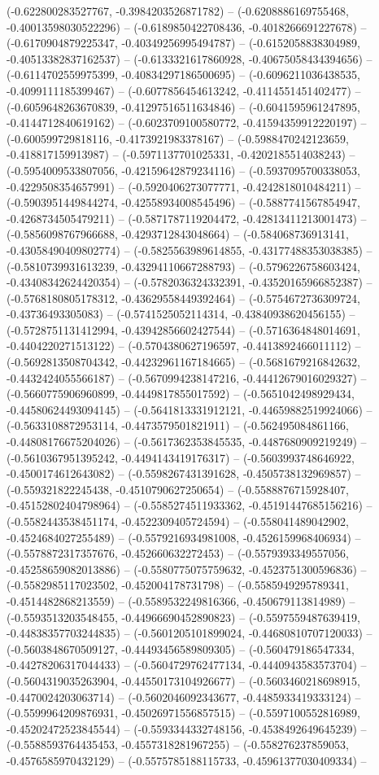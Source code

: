 (-0.622800283527767, -0.3984203526871782) -- (-0.6208886169755468, -0.40013598030522296) -- (-0.6189850422708436, -0.4018266691227678) -- (-0.6170904879225347, -0.40349256995494787) -- (-0.6152058838304989, -0.40513382837162537) -- (-0.6133321617860928, -0.40675058434394656) -- (-0.6114702559975399, -0.40834297186500695) -- (-0.6096211036438535, -0.4099111185399467) -- (-0.6077856454613242, -0.4114551451402477) -- (-0.6059648263670839, -0.41297516511634846) -- (-0.6041595961247895, -0.4144712840619162) -- (-0.6023709100580772, -0.41594359912220197) -- (-0.600599729818116, -0.4173921983378167) -- (-0.5988470242123659, -0.418817159913987) -- (-0.5971137701025331, -0.4202185514038243) -- (-0.5954009533807056, -0.42159642879234116) -- (-0.5937095700338053, -0.4229508354657991) -- (-0.5920406273077771, -0.4242818010484211) -- (-0.5903951449844274, -0.42558934008545496) -- (-0.5887741567854947, -0.4268734505479211) -- (-0.5871787119204472, -0.42813411213001473) -- (-0.5856098767966688, -0.4293712843048664) -- (-0.584068736913141, -0.43058490409802774) -- (-0.5825563989614855, -0.43177488353038385) -- (-0.5810739931613239, -0.43294110667288793) -- (-0.5796226758603424, -0.43408342624420354) -- (-0.5782036324332391, -0.43520165966852387) -- (-0.5768180805178312, -0.43629558449392464) -- (-0.5754672736309724, -0.43736493305083) -- (-0.5741525052114314, -0.43840938620456155) -- (-0.5728751131412994, -0.43942856602427544) -- (-0.5716364848014691, -0.4404220271513122) -- (-0.5704380627196597, -0.4413892466011112) -- (-0.5692813508704342, -0.44232961167184665) -- (-0.5681679216842632, -0.4432424055566187) -- (-0.5670994238147216, -0.44412679016029327) -- (-0.5660775906960899, -0.4449817855017592) -- (-0.5651042498929434, -0.44580624493094145) -- (-0.5641813331912121, -0.44659882519924066) -- (-0.5633108872953114, -0.4473579501821911) -- (-0.562495084861166, -0.44808176675204026) -- (-0.5617362353845535, -0.4487680909219249) -- (-0.5610367951395242, -0.4494143419176317) -- (-0.5603993748646922, -0.4500174612643082) -- (-0.5598267431391628, -0.4505738132969857) -- (-0.559321822245438, -0.4510790627250654) -- (-0.5588876715928407, -0.45152802404798964) -- (-0.5585274511933362, -0.45191447685156216) -- (-0.5582443538451174, -0.4522309405724594) -- (-0.558041489042902, -0.4524684027255489) -- (-0.5579216934981008, -0.4526159968406934) -- (-0.5578872317357676, -0.452660632272453) -- (-0.5579393349557056, -0.45258659082013886) -- (-0.5580775075759632, -0.4523751300596836) -- (-0.5582985117023502, -0.452004178731798) -- (-0.5585949295789341, -0.4514482868213559) -- (-0.5589532249816366, -0.450679113814989) -- (-0.5593513203548455, -0.44966690452890823) -- (-0.5597559487639419, -0.44838357703244835) -- (-0.5601205101899024, -0.44680810707120033) -- (-0.5603848670509127, -0.44493456589809305) -- (-0.560479186547334, -0.44278206317044433) -- (-0.5604729762477134, -0.4440943583573704) -- (-0.5604319035263904, -0.44550173104926677) -- (-0.5603460218698915, -0.4470024203063714) -- (-0.5602046092343677, -0.4485933419333124) -- (-0.5599964209876931, -0.45026971556857515) -- (-0.5597100552816989, -0.45202472523845544) -- (-0.5593344332748156, -0.4538492649645239) -- (-0.5588593764435453, -0.4557318281967255) -- (-0.558276237859053, -0.4576585970432129) -- (-0.5575785188115733, -0.45961377030409334) -- 